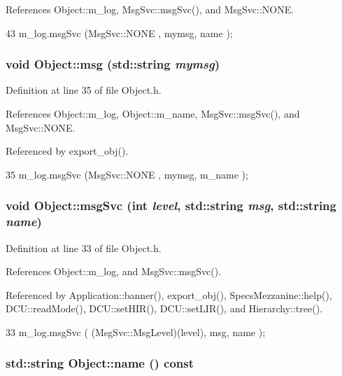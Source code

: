 References Object::m\_\-log, MsgSvc::msgSvc(), and MsgSvc::NONE.


\begin{DoxyCode}
43 { m_log.msgSvc (MsgSvc::NONE    , mymsg, name ); }
\end{DoxyCode}
\hypertarget{classObject_a58b2d0618c2d08cf2383012611528d97}{
\subsubsection[{msg}]{\setlength{\rightskip}{0pt plus 5cm}void Object::msg (std::string {\em mymsg})}}
\label{classObject_a58b2d0618c2d08cf2383012611528d97}


Definition at line 35 of file Object.h.

References Object::m\_\-log, Object::m\_\-name, MsgSvc::msgSvc(), and MsgSvc::NONE.

Referenced by export\_\-obj().


\begin{DoxyCode}
35 { m_log.msgSvc (MsgSvc::NONE    , mymsg, m_name ); }
\end{DoxyCode}
\hypertarget{classObject_a3f9d5537ebce0c0f2bf6ae4d92426f3c}{
\subsubsection[{msgSvc}]{\setlength{\rightskip}{0pt plus 5cm}void Object::msgSvc (int {\em level}, \/  std::string {\em msg}, \/  std::string {\em name})}}
\label{classObject_a3f9d5537ebce0c0f2bf6ae4d92426f3c}


Definition at line 33 of file Object.h.

References Object::m\_\-log, and MsgSvc::msgSvc().

Referenced by Application::banner(), export\_\-obj(), SpecsMezzanine::help(), DCU::readMode(), DCU::setHIR(), DCU::setLIR(), and Hierarchy::tree().


\begin{DoxyCode}
33 { m_log.msgSvc ( (MsgSvc::MsgLevel)(level), msg, name ); }
\end{DoxyCode}
\hypertarget{classObject_a975e888d50bfcbffda2c86368332a5cd}{
\subsubsection[{name}]{\setlength{\rightskip}{0pt plus 5cm}std::string Object::name () const}}
\label{classObject_a975e888d50bfcbffda2c86368332a5cd}


